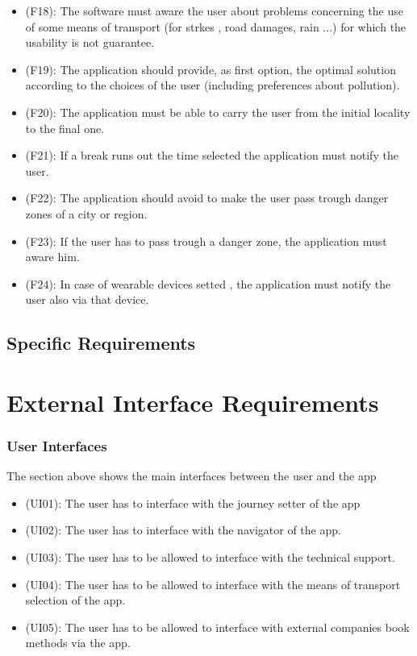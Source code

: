 \documentclass[a4paper,leqno]{book}
\begin{document}
\begin{itemize}
\item (F18): The software must aware the user about problems concerning the use of some means of transport (for strkes , road damages, rain ...) for which the usability is not guarantee.
\item (F19): The application should provide, as first option, the optimal solution according to the choices of the user (including preferences about pollution).
\item (F20): The application must be able to carry the user from the initial locality to the final one.
\item (F21): If a break runs out the time selected the application must notify the user.
\item (F22): The application should avoid to make the user pass trough danger zones of a city or region.
\item (F23): If the user has to pass trough a danger zone, the application must aware him.
\item (F24): In case of wearable devices setted , the application must notify the user also via that device.

\end{itemize}

\chapter{Specific Requirements}

\part{External Interface Requirements}

\section{User Interfaces}
The section above shows the main interfaces between the user and the app 
\begin{itemize}
\item (UI01): The user has to interface with the journey setter of the app
\item (UI02): The user has to interface with the navigator of the app.
\item (UI03): The user has to be allowed to interface with the technical support.
\item (UI04): The user has to be allowed to interface with the means of transport selection of the app.
\item (UI05): The user has to be allowed to interface with external companies book methods via the app.
\end{itemize}
\end{document}
